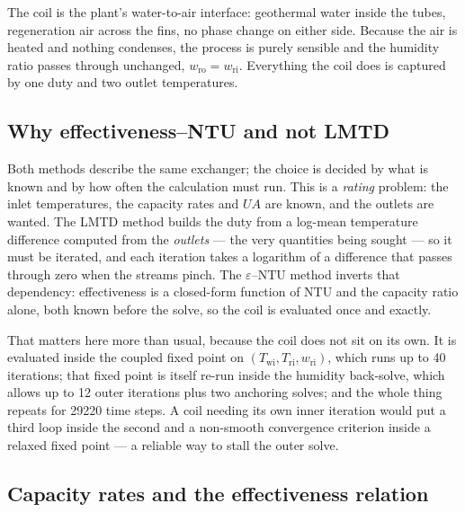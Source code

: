 \documentclass[11pt]{article}
\newcommand{\UA}{\ensuremath{U\!A}}
\begin{document}
The coil is the plant's water-to-air interface: geothermal water inside the tubes, regeneration
air across the fins, no phase change on either side. Because the air is heated and nothing
condenses, the process is purely sensible and the humidity ratio passes through unchanged,
$w_{\mathrm{ro}}=w_{\mathrm{ri}}$. Everything the coil does is captured by one duty and two
outlet temperatures.

\subsection{Why effectiveness--NTU and not LMTD}
\label{sec:hyd:whyntu}

Both methods describe the same exchanger; the choice is decided by what is known and by how
often the calculation must run. This is a \emph{rating} problem: the inlet temperatures, the
capacity rates and $\UA$ are
known, and the outlets are wanted. The LMTD method builds the duty from a log-mean temperature
difference computed from the \emph{outlets} --- the very quantities being sought --- so it must
be iterated, and each iteration takes a logarithm of a difference that passes through zero when
the streams pinch. The $\varepsilon$--$\mathrm{NTU}$ method inverts that dependency:
effectiveness is a closed-form function of $\mathrm{NTU}$ and the capacity ratio alone, both
known before the solve, so the coil is evaluated once and exactly.

That matters here more than usual, because the coil does not sit on its own. It is evaluated
inside the coupled fixed point on $(T_{\mathrm{wi}},T_{\mathrm{ri}},w_{\mathrm{ri}})$, which
runs up to \num{40} iterations; that fixed point is itself re-run inside the humidity
back-solve, which allows up to \num{12} outer iterations plus two anchoring solves; and the
whole thing repeats for \num{29220} time steps. A coil needing its own inner iteration would
put a third loop inside the second and a non-smooth convergence criterion inside a relaxed
fixed point --- a reliable way to stall the outer solve.

\subsection{Capacity rates and the effectiveness relation}
\label{sec:hyd:coileqs}
\end{document}
